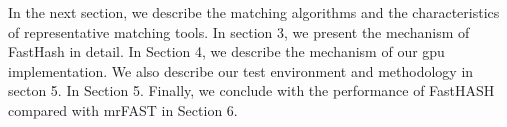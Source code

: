 In the next section, we describe the matching algorithms and the
characteristics of representative matching tools. In section 3, we present the
mechanism of FastHash in detail. In Section 4, we describe the mechanism of our
gpu implementation. We also describe our test environment and methodology in
secton 5. In Section 5. Finally, we conclude with the performance of FastHASH
compared with mrFAST in Section 6. \\

